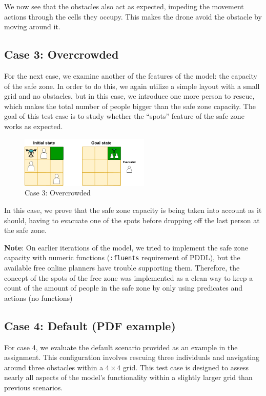 \documentclass{article}
\begin{document}
We now see that the obstacles also act as expected, impeding the movement actions through the cells they occupy. This makes the drone avoid the obstacle by moving around it.

\subsection{Case 3: Overcrowded}

For the next case, we examine another of the features of the model: the capacity of the safe zone. In order to do this, we again utilize a simple layout with a small grid and no obstacles, but in this case, we introduce one more person to rescue, which makes the total number of people bigger than the safe zone capacity. The goal of this test case is to study whether the “spots” feature of the safe zone works as expected.

\begin{figure}[H]
    \centering
    \includegraphics[width=0.55\textwidth]{assets/problem-3-overcrowded.drawio.png}
    \caption{Case 3: Overcrowded}
    \label{fig:initial-state-overcrowded}
\end{figure}
\FloatBarrier

In this case, we prove that the safe zone capacity is being taken into account as it should, having to evacuate one of the spots before dropping off the last person at the safe zone.

\textbf{Note}: On earlier iterations of the model, we tried to implement the safe zone capacity with numeric functions (\texttt{:fluents} requirement of PDDL), but the available free online planners have trouble supporting them. Therefore, the concept of the spots of the free zone was implemented as a clean way to keep a count of the amount of people in the safe zone by only using predicates and actions (no functions)

\subsection{Case 4: Default (PDF example)}

For case 4, we evaluate the default scenario provided as an example in the assignment. This configuration involves rescuing three individuals and navigating around three obstacles within a \(4 \times 4\) grid. This test case is designed to assess nearly all aspects of the model's functionality within a slightly larger grid than previous scenarios.
\end{document}

